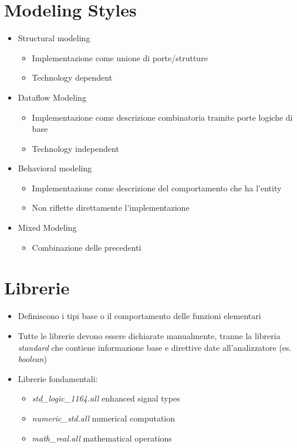 \documentclass{article}
\begin{document}
\section{Modeling Styles}
\begin{itemize}
	\item Structural modeling
	      \begin{itemize}
	      	\item Implementazione come unione di porte/strutture
	      	\item Technology dependent
	      \end{itemize}
	\item Dataflow Modeling
	      \begin{itemize}
	      	\item Implementazione come descrizione combinatoria tramite porte logiche di base
	      	\item Technology independent
	      \end{itemize}
	\item Behavioral modeling
	      \begin{itemize}
	      	\item Implementazione come descrizione del comportamento che ha l'entity
	      	\item Non riflette direttamente l'implementazione
	      \end{itemize}
	\item Mixed Modeling
	      \begin{itemize}
	      	\item Combinazione delle precedenti
	      \end{itemize}
\end{itemize}

\section{Librerie}
\begin{itemize}
	\item Definiscono i tipi base o il comportamento delle funzioni elementari
	\item Tutte le librerie devono essere dichiarate manualmente, tranne la libreria \textit{standard} che contiene informazione base e direttive date all'analizzatore (es. \textit{boolean})
	\item Librerie fondamentali:
	      \begin{itemize}
	      	\item \textit{std\_logic\_1164.all} enhanced signal types
	      	\item \textit{numeric\_std.all} numerical computation
	      	\item \textit{math\_real.all} mathematical operations
	      \end{itemize}
\end{itemize}
\end{document}
